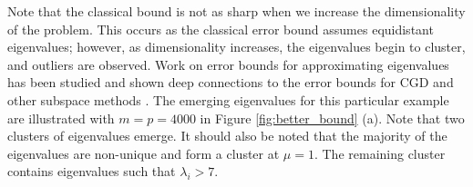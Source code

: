 \documentclass[11p]{elsarticle}
\numberwithin{equation}{section}
\begin{document}
Note that the classical bound is not as sharp when we increase the dimensionality of the problem.  This occurs as the classical error bound assumes equidistant eigenvalues; however, as dimensionality increases, the eigenvalues begin to cluster, and outliers are observed.  Work on error bounds for approximating eigenvalues has been studied and shown deep connections to the error bounds for CGD and other subspace methods \cite{Haas2025}.  The emerging eigenvalues for this particular example are illustrated with $m=p=4000$ in Figure \ref{fig:better_bound} (a).  Note that two clusters of eigenvalues emerge.  It should also be noted that the majority of the eigenvalues are non-unique and form a cluster at $\mu=1$.  The remaining cluster contains eigenvalues such that $\lambda_i>7$.
\end{document}
